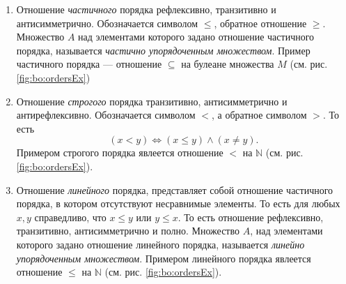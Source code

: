 \begin{enumerate}
    \item Отношение \emph{частичного} порядка рефлексивно, транзитивно и антисимметрично. Обозначается символом $\leq$, обратное отношение $\geq$. Множество $A$ над элементами которого задано отношение частичного порядка, называется \emph{частично упорядоченным множеством}. Пример частичного порядка --- отношение $\subseteq$ на булеане множества $M$ (см. рис. \ref{fig:bo:ordersEx})
    
    \item Отношение \emph{строгого} порядка транзитивно, антисимметрично и антирефлексивно. Обозначается символом $<$, а обратное символом $>$. То есть
    \[(x<y)\Leftrightarrow (x\leq y)\land(x\neq y).\]
    Примером строгого порядка явлеется отношение $<$ на $\mathbb{N}$ (см. рис. \ref{fig:bo:ordersEx}).
    
    \item Отношение \emph{линейного} порядка, представляет собой отношение частичного порядка, в котором отсутствуют несравнимые элементы. То есть для любых $x,y$ справедливо, что $x\leq y$ или $y\leq x$. То есть отношение рефлексивно, транзитивно, антисимметрично и полно. Множество $A$, над элементами которого задано отношение линейного порядка, называется \emph{линейно упорядоченным множеством}. Примером линейного порядка явлеется отношение $\leq$ на $\mathbb{N}$ (см. рис. \ref{fig:bo:ordersEx}).
\end{enumerate}

